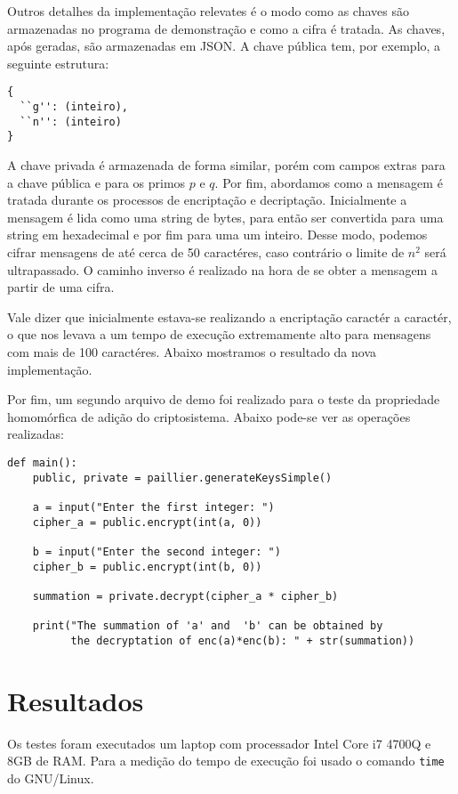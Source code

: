 \documentclass[10pt]{article}
\begin{document}
        Outros detalhes da implementação relevates é o modo como as chaves são armazenadas no programa de demonstração e como a cifra é tratada. As chaves, após geradas, são armazenadas em JSON. A chave pública tem, por exemplo, a seguinte estrutura:

        \begin{verbatim}
{
  ``g'': (inteiro),
  ``n'': (inteiro)
}
        \end{verbatim}

        A chave privada é armazenada de forma similar, porém com campos extras para a chave pública e para os primos $p$ e $q$. Por fim, abordamos como a mensagem é tratada durante os processos de encriptação e decriptação. Inicialmente a mensagem é lida como uma string de bytes, para então ser convertida para uma string em hexadecimal e por fim para uma um inteiro. Desse modo, podemos cifrar mensagens de até cerca de 50 caractéres, caso contrário o limite de $n^2$ será ultrapassado. O caminho inverso é realizado na hora de se obter a mensagem a partir de uma cifra. 

        Vale dizer que inicialmente estava-se realizando a encriptação caractér a caractér, o que nos levava a um tempo de execução extremamente alto para mensagens com mais de 100 caractéres. Abaixo mostramos o resultado da nova implementação.

        Por fim, um segundo arquivo de demo foi realizado para o teste da propriedade homomórfica de adição do criptosistema. Abaixo pode-se ver as operações realizadas:

        \begin{verbatim}
def main():
    public, private = paillier.generateKeysSimple()

    a = input("Enter the first integer: ")
    cipher_a = public.encrypt(int(a, 0))

    b = input("Enter the second integer: ")
    cipher_b = public.encrypt(int(b, 0))

    summation = private.decrypt(cipher_a * cipher_b)

    print("The summation of 'a' and  'b' can be obtained by 
          the decryptation of enc(a)*enc(b): " + str(summation))
        \end{verbatim}

    \section{Resultados}
        Os testes foram executados um laptop com processador Intel Core i7 4700Q e 8GB de RAM. Para a medição do tempo de execução foi usado o comando \texttt{time} do GNU/Linux.
\end{document}
